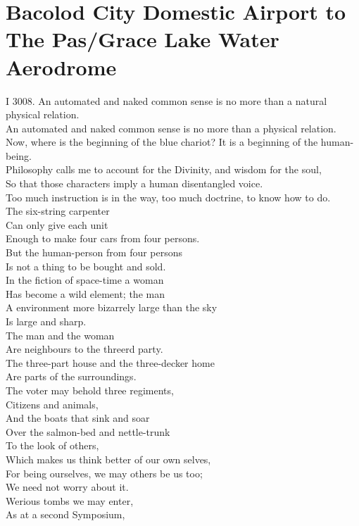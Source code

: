 \documentclass[smalldemyvopaper,11pt,twoside,onecolumn,openright,extrafontsizes]{memoir}
\begin{document}
\chapter{Bacolod City Domestic Airport to The Pas/Grace Lake Water Aerodrome}
I 3008. An automated and naked common sense is no more than a natural physical relation.
\\An automated and naked common sense is no more than a physical relation.
\\Now, where is the beginning of the blue chariot? It is a beginning of the human-being.
\\Philosophy calls me to account for the Divinity, and wisdom for the soul,
\\So that those characters imply a human disentangled voice.
\\Too much instruction is in the way, too much doctrine, to know how to do.
\\The six-string carpenter
\\Can only give each unit
\\Enough to make four cars from four persons.
\\But the human-person from four persons
\\Is not a thing to be bought and sold.
\\In the fiction of space-time a woman
\\Has become a wild element; the man
\\A environment more bizarrely large than the sky
\\Is large and sharp.
\\The man and the woman
\\Are neighbours to the threerd party.
\\The three-part house and the three-decker home
\\Are parts of the surroundings.
\\The voter may behold three regiments,
\\Citizens and animals,
\\And the boats that sink and soar
\\Over the salmon-bed and nettle-trunk
\\To the look of others,
\\Which makes us think better of our own selves,
\\For being ourselves, we may others be us too;
\\We need not worry about it.
\\Werious tombs we may enter,
\\As at a second Symposium,
\end{document}
